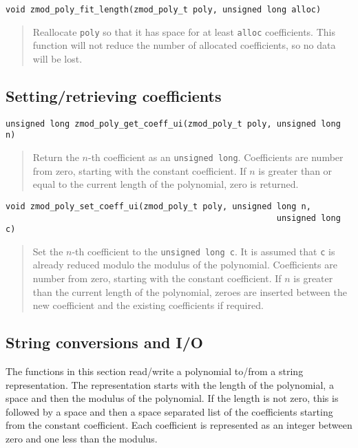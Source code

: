 \documentclass[a4paper,10pt]{article}
\newcommand{\code}{\lstinline}
\begin{document}
\begin{lstlisting}
void zmod_poly_fit_length(zmod_poly_t poly, unsigned long alloc)
\end{lstlisting}
\begin{quote}
Reallocate \code{poly} so that it has space for at least \code{alloc} coefficients. This function will not reduce the number of allocated coefficients, so no data will be lost.
\end{quote}

\subsection{Setting/retrieving coefficients}

\begin{lstlisting}
unsigned long zmod_poly_get_coeff_ui(zmod_poly_t poly, unsigned long n)
\end{lstlisting}
\begin{quote}
Return the $n$-th coefficient as an \code{unsigned long}. Coefficients are number from zero, starting with the constant coefficient. If $n$ is greater than or equal to the current length of the polynomial, zero is returned.
\end{quote}

\begin{lstlisting}
void zmod_poly_set_coeff_ui(zmod_poly_t poly, unsigned long n, 
                                                       unsigned long c)
\end{lstlisting}
\begin{quote}
Set the $n$-th coefficient to the \code{unsigned long c}. It is assumed that \code{c} is already reduced modulo the modulus of the polynomial. Coefficients are number from zero, starting with the constant coefficient. If $n$ is greater than the current length of the polynomial, zeroes are inserted between the new coefficient and the existing coefficients if required.
\end{quote}

\subsection{String conversions and I/O}
The functions in this section read/write a polynomial to/from a string representation. The representation starts with the length of the polynomial, a space and then the modulus of the polynomial. If the length is not zero, this is followed by a space and then a space separated list of the coefficients starting from the constant coefficient. Each coefficient is represented as an integer between zero and one less than the modulus.
\end{document}
